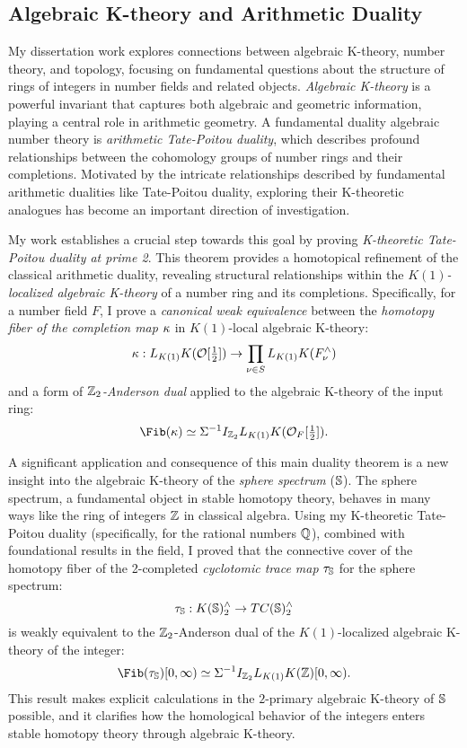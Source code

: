 \documentclass[11pt]{article}
\begin{document}
\subsection{Algebraic K-theory and Arithmetic Duality}
My dissertation work explores connections between algebraic K-theory, number theory, and topology, focusing on fundamental questions about the structure of rings of integers in number fields and related objects. {\it Algebraic K-theory} is a powerful invariant that captures both algebraic and geometric information, playing a central role in arithmetic geometry. A fundamental duality algebraic number theory is {\it arithmetic Tate-Poitou duality}, which describes profound relationships between the cohomology groups of number rings and their completions. Motivated by the intricate relationships described by fundamental arithmetic dualities like Tate-Poitou duality, exploring their K-theoretic analogues has become an important direction of investigation.

My work \cite{Cho} establishes a crucial step towards this goal by proving {\it K-theoretic Tate-Poitou duality at prime 2}. This theorem provides a homotopical refinement of the classical arithmetic duality, revealing structural relationships within the {\it $K(1)$-localized algebraic K-theory} of a number ring and its completions. Specifically, for a number field $F$, I prove a {\it canonical weak equivalence} between the {\it homotopy fiber of the completion map} $\kappa$ in $K(1)$-local algebraic K-theory:
\[\kappa: L_{K(1)}K({\mathcal{O}}[\tfrac{1}{2}]) \to \prod_{\nu\in S} L_{K(1)}K (F_\nu^\wedge)\]
 and a form of {\it $\mathbb{Z}_2$-Anderson dual} applied to the algebraic K-theory of the input ring: 
 \begin{equation}\label{fib}
 \Fib(\ka) \simeq \SI^{-1} I_{\bZ_2} L_{K(1)}K(\calO_F[\tfrac{1}{2}]).
\end{equation}

A significant application and consequence of this main duality theorem is a new insight into the algebraic K-theory of the {\it sphere spectrum} ($\mathbb{S}$). The sphere spectrum, a fundamental object in stable homotopy theory, behaves in many ways like the ring of integers $\mathbb{Z}$ in classical algebra. Using my K-theoretic Tate-Poitou duality (specifically, for the rational numbers $\mathbb{Q}$), combined with foundational results in the field, I proved that the connective cover of the homotopy fiber of the 2-completed {\it cyclotomic trace map} $\tau_{\mathbb{S}}$ for the sphere spectrum:
\[\tau_{\mathbb{S}}: K(\mathbb{S})_2^\wedge \to TC(\mathbb{S})_2^\wedge\]
 is weakly equivalent to the $\mathbb{Z}_2$-Anderson dual of the $K(1)$-localized algebraic K-theory of the integer: 
\[\Fib(\ta_\bS)[0,\infty) \simeq \SI^{-1}I_{\bZ_2} L_{K(1)} K(\bZ)[0,\infty).\]
This result makes explicit calculations in the $2$-primary algebraic K-theory of $\mathbb{S}$ possible, and it clarifies how the homological behavior of the integers enters stable homotopy theory through algebraic K-theory.
\end{document}
